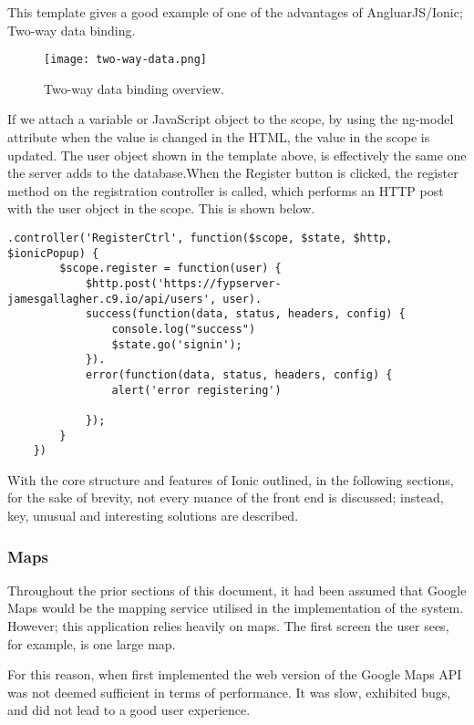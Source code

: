 \documentclass[a4paper]{article}
\begin{document}
This template gives a good example of one of the advantages of AngluarJS/Ionic; Two-way data binding.
\begin{figure}[H]
  \caption{Two-way data binding overview.}
  \centering
    \texttt{[image: two-way-data.png]}
\end{figure}

If we attach a variable or JavaScript object to the scope, by using the ng-model attribute when the value is changed in the HTML, the value in the scope is updated. The user object shown in the template above, is effectively the same one the server adds to the database.When the Register button is clicked, the register method on the registration controller is called, which performs an HTTP post with the user object in the scope. This is shown below.

 \begin{lstlisting}[label=The registration controller ,caption=The registration controller]
    .controller('RegisterCtrl', function($scope, $state, $http, $ionicPopup) {
        $scope.register = function(user) {
            $http.post('https://fypserver-jamesgallagher.c9.io/api/users', user).
            success(function(data, status, headers, config) {
                console.log("success")
                $state.go('signin');
            }).
            error(function(data, status, headers, config) {
                alert('error registering')

            });
        }
    })
\end{lstlisting}

With the core structure and features of Ionic outlined, in the following sections, for the sake of brevity, not every nuance of the front end is discussed; instead, key, unusual and interesting solutions are described. 

\subsubsection{Maps}
Throughout the prior sections of this document, it had been assumed that Google Maps would be the mapping service utilised in the implementation of the system. However; this application relies heavily on maps. The first screen the user sees, for example, is one large map.

For this reason, when first implemented the web version of the Google Maps API was not deemed sufficient in terms of performance. It was slow, exhibited bugs, and did not lead to a good user experience.
\end{document}
